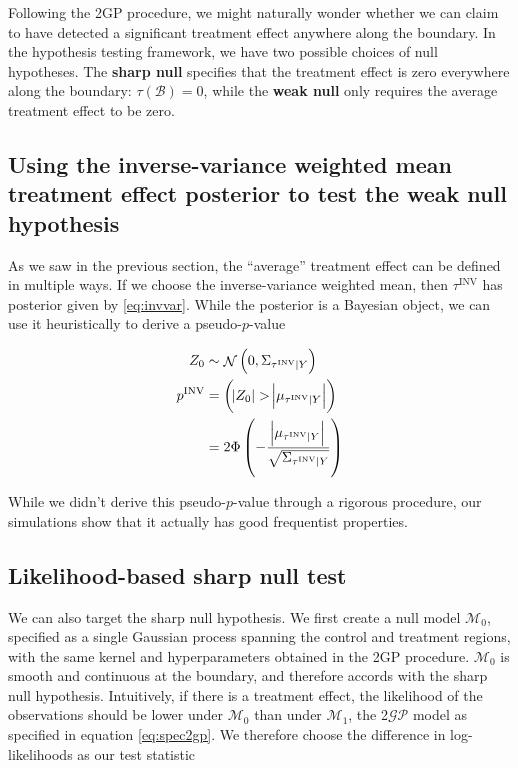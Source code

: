 \documentclass[letter]{article}
\let\Pr\relax
\DeclareMathOperator{\Pr}{\mathbb{P}}
\DeclareMathOperator{\normal}{\mathcal{N}}
\newcommand{\gp}{\mathcal{GP}}
\newcommand{\boundary}{\mathcal{B}}
\newcommand{\invvar}{\tau^{\mathrm{INV}}}
\newcommand{\modnull}{\mathscr{M}_0}
\newcommand{\modalt}{\mathscr{M}_1}
\begin{document}
Following the 2GP procedure, we might naturally wonder whether we can claim to have detected a significant treatment effect anywhere along the boundary.
In the hypothesis testing framework, we have two possible choices of null hypotheses.
The \textbf{sharp null} specifies that the treatment effect is zero everywhere along the boundary:
\(\tau(\boundary)=0\),
while the \textbf{weak null} only requires the average treatment effect to be zero.

\subsection{Using the inverse-variance weighted mean treatment effect posterior to test the weak null hypothesis}\label{using-the-inverse-variance-weighted-mean-treatment-effect-posterior-to-test-the-weak-null-hypothesis}

As we saw in the previous section, the ``average'' treatment effect can be defined in multiple ways.
If we choose the inverse-variance weighted mean, then \(\invvar\) has posterior given by \eqref{eq:invvar}.
While the posterior is a Bayesian object, we can use it heuristically to derive a pseudo-\(p\)-value

\begin{equation}
\begin{split}
    Z_0 &\sim \normal\del{0, \Sigma_{\invvar \mid Y}}  \\
    p^{\mathrm{INV}} &= \Pr\del{ 
        \abs{Z_0} > 
        \abs{
            \mu_{
                \invvar \mid Y
            }
        } 
    } \\
    &= 2\Phi\del{-
        \frac{
            \abs{
                \mu_{
                    \invvar \mid Y
                }
            }
        }{
            \sqrt{
                \Sigma_{\invvar \mid Y}
            }
        }
    }
\end{split}
\end{equation}

While we didn't derive this pseudo-\(p\)-value through a rigorous procedure, our simulations show that it actually has good frequentist properties.
    


    	\subsection{Likelihood-based sharp null test}\label{likelihood-based-sharp-null-test}

We can also target the sharp null hypothesis.
We first create a null model \(\modnull\),
specified as a single Gaussian process spanning the control and treatment regions,
with the same kernel and hyperparameters obtained in the 2GP procedure.
\(\modnull\) is smooth and continuous at the boundary,
and therefore accords with the sharp null hypothesis.
Intuitively, if there is a treatment effect,
the likelihood of the observations should be lower under \(\modnull\) than under \(\modalt\),
the 2\(\gp\) model as specified in equation \eqref{eq:spec2gp}.
We therefore choose the difference in log-likelihoods as our test statistic
\end{document}
